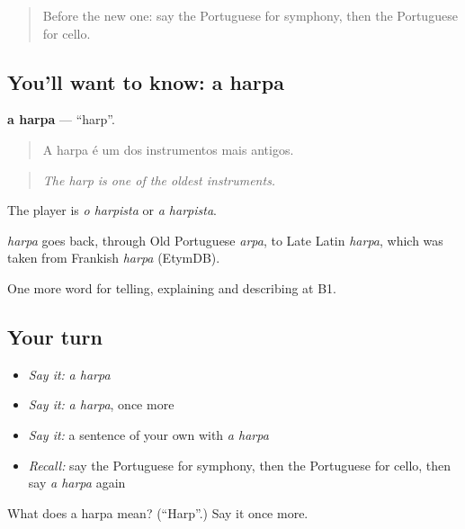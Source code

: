 \label{lesson:PT-C516-harpa}



\begin{quote}
Before the new one: say the Portuguese for symphony, then the Portuguese for cello.
\end{quote}

\subsection*{You'll want to know: a harpa}
\textbf{a harpa} — \textquotedblleft{}harp\textquotedblright{}.

\begin{quote}
A harpa é um dos instrumentos mais antigos.
\end{quote}

\begin{quote}
\emph{The harp is one of the oldest instruments.}
\end{quote}

The player is \emph{o harpista} or \emph{a harpista}.

\begin{cousinweb}
\emph{harpa} goes back, through Old Portuguese \emph{arpa}, to Late Latin \emph{harpa}, which was taken from Frankish \emph{harpa} (EtymDB).
\end{cousinweb}

\begin{grammarlens}[title={What you've built}]
One more word for telling, explaining and describing at B1.
\end{grammarlens}

\subsection*{Your turn}
\begin{itemize}
\raggedright
  \item \emph{Say it:} \emph{a harpa}
  \item \emph{Say it:} \emph{a harpa}, once more
  \item \emph{Say it:} a sentence of your own with \emph{a harpa}
  \item \emph{Recall:} say the Portuguese for symphony, then the Portuguese for cello, then say \emph{a harpa} again
\end{itemize}

\begin{tcolorbox}[breakable,colback=teal!4,colframe=teal!35!black,title={Before you move on}]
What does a harpa mean? (\textquotedblleft{}Harp\textquotedblright{}.) Say it once more.
\end{tcolorbox}
